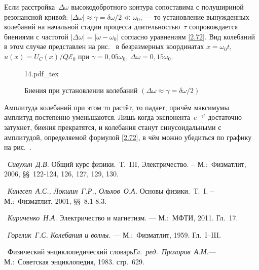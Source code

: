 \documentclass[a4paper,oneside]{book}
\begin{document}
Если расстройка~$\Delta\omega$ высокодобротного контура сопоставима с полушириной резонансной кривой: $|\Delta\omega|\approx\gamma=\delta\omega/2\ll\omega_0$, --- то установление вынужденных колебаний на
начальной стадии процесса длительностью~$\tau$ сопровождается биениями с
частотой $|\Delta\omega|=|\omega-\omega_0|$ согласно уравнениям \eqref{2.72}.
Вид колебаний в этом случае представлен на рис.~ в безразмерных координатах $x = \omega_0t$, $u(x) = U_C(x)/Q\mathcal{E}_0$ при $\gamma = 0,05\omega_0$, $\Delta \omega = 0,15\omega_0$.

\begin{figure}[h!]
	\centering
	{14.pdf_tex}
	\caption{Биения при установлении колебаний
$(\Delta\omega\approx\gamma=\delta\omega/2)$}
\end{figure}

Амплитуда колебаний при этом то растёт, то падает, причём максимумы амплитуд
постепенно уменьшаются. Лишь когда экспонента~$e^{-\gamma t}$ достаточно
затухнет, биения прекратятся, и колебания станут синусоидальными с амплитудой, определяемой формулой \eqref{2.72}, в чём можно убедиться по графику на рис.~.



\begin{lab:literature}
	\item~\emph{Сивухин~Д.В.} Общий курс физики.~Т.~III, Электричество.
\textbf{--} М.:~Физматлит, 2006, \S\S~122-124, 126, 127, 129, 130.
	\item~\emph{Кингсеп~А.С., Локшин~Г.Р., Ольхов~О.А.} Основы физики.~Т.~I.
\textbf{--} М.:~Физматлит, 2001, \S\S~8.1-8.3.
	\item~\emph{Кириченко~Н.А.} Электричество и магнетизм. --- М.:~МФТИ,
2011. Гл.~17.
	\item~\emph{Горелик~Г.С. Колебания и волны.} --- М.:~Физматлит,
1959. Гл.~I--III.
	\item~Физический энциклопедический словарь\emph{Гл.~ред.~Прохоров~А.М.}--- М.:~Советская энциклопедия, 1983. стр.~629.
\end{lab:literature}
\end{document}
